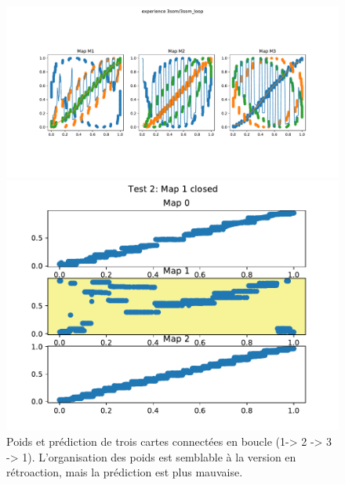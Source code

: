 \begin{figure}
\begin{minipage}{0.5\textwidth}
\includegraphics[width=\textwidth]{3som_loop_w.pdf}

\end{minipage}
\begin{minipage}{0.5\textwidth}
\includegraphics[width=\textwidth]{3som_loop_pred.pdf}
\end{minipage}
\caption{Poids et prédiction de trois cartes connectées en boucle (1-> 2 -> 3 -> 1). L'organisation des poids est semblable à la version en rétroaction, mais la prédiction est plus mauvaise.}
\label{fig:3som_loop}
\end{figure}

